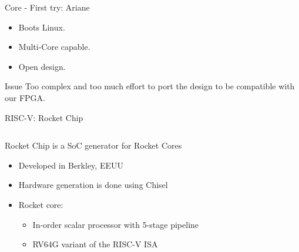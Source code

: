 \begin{frame}{Core - First try: Ariane}
    \begin{itemize}
            \item Boots Linux.
            \item Multi-Core capable.
            \item Open design.
    \end{itemize}

    \begin{alertblock}{Issue}
            Too complex and too much effort to port the design to be compatible with our FPGA.	
    \end{alertblock}
\end{frame}



\begin{frame}{RISC-V: Rocket Chip}
\begin{columns}[T]
  \begin{column}{0.5\textwidth} %
Rocket Chip is a SoC generator for Rocket Cores
\begin{itemize}
    \item Developed in Berkley, EEUU
    \item Hardware generation is done using Chisel
    \item Rocket core: 
    \begin{itemize}
        \item In-order scalar processor with 5-stage pipeline
        \item RV64G variant of the RISC-V ISA
    \end{itemize}
\end{itemize}
\end{column}
\begin{column}{.5\textwidth} %


\end{column}
\end{columns}
\end{frame}
